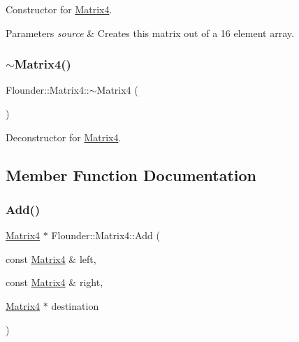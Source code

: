 Constructor for \hyperlink{class_flounder_1_1_matrix4}{Matrix4}. 


\begin{DoxyParams}{Parameters}
{\em source} & Creates this matrix out of a 16 element array. \\
\hline
\end{DoxyParams}
\mbox{\label{class_flounder_1_1_matrix4_ad070890e22fca24ef9ae7bf38165b1aa}} 
\subsubsection{\texorpdfstring{$\sim$\+Matrix4()}{~Matrix4()}}
{\footnotesize\ttfamily Flounder\+::\+Matrix4\+::$\sim$\+Matrix4 (\begin{DoxyParamCaption}{ }\end{DoxyParamCaption})}



Deconstructor for \hyperlink{class_flounder_1_1_matrix4}{Matrix4}. 



\subsection{Member Function Documentation}
\mbox{\label{class_flounder_1_1_matrix4_a272ae0d868f7e9f1ecfbd389ccfd3aef}} 
\subsubsection{\texorpdfstring{Add()}{Add()}}
{\footnotesize\ttfamily \hyperlink{class_flounder_1_1_matrix4}{Matrix4} $\ast$ Flounder\+::\+Matrix4\+::\+Add (\begin{DoxyParamCaption}\item[{const \hyperlink{class_flounder_1_1_matrix4}{Matrix4} \&}]{left,  }\item[{const \hyperlink{class_flounder_1_1_matrix4}{Matrix4} \&}]{right,  }\item[{\hyperlink{class_flounder_1_1_matrix4}{Matrix4} $\ast$}]{destination }\end{DoxyParamCaption})\hspace{0.3cm}{\ttfamily [static]}}



